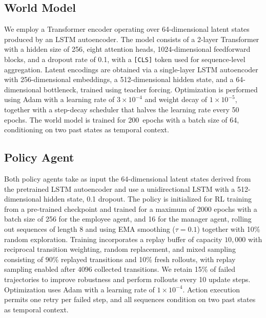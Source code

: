 \subsection{World Model}
We employ a Transformer encoder operating over 64-dimensional latent states produced by an LSTM autoencoder. The model consists of a 2-layer Transformer with a hidden size of 256, eight attention heads, 1024-dimensional feedforward blocks, and a dropout rate of 0.1, with a \texttt{[CLS]} token used for sequence-level aggregation. Latent encodings are obtained via a single-layer LSTM autoencoder with 256-dimensional embeddings, a 512-dimensional hidden state, and a 64-dimensional bottleneck, trained using teacher forcing. Optimization is performed using Adam \citep{KingmaB2015} with a learning rate of $3\times10^{-4}$ and weight decay of $1\times10^{-5}$, together with a step-decay scheduler that halves the learning rate every 50 epochs. The world model is trained for 200~epochs with a batch size of 64, conditioning on two past states as temporal context.

\subsection{Policy Agent}
Both policy agents take as input the 64-dimensional latent states derived from the pretrained LSTM autoencoder and use a unidirectional LSTM with a 512-dimensional hidden state, 0.1 dropout. The policy is initialized for RL training from a pre-trained checkpoint and trained for a maximum of 2000 epochs with a batch size of 256 for the employee agent, and 16 for the manager agent, rolling out sequences of length 8 and using EMA smoothing ($\tau = 0.1$) together with 10\% random exploration. Training incorporates a replay buffer of capacity $10{,}000$ with reciprocal transition weighting, random replacement, and mixed sampling consisting of 90\% replayed transitions and 10\% fresh rollouts, with replay sampling enabled after $4096$ collected transitions. We retain 15\% of failed trajectories to improve robustness and perform rollouts every 10 update steps. Optimization uses Adam \citep{KingmaB2015} with a learning rate of $1\times 10^{-4}$. Action execution permits one retry per failed step, and all sequences condition on two past states as temporal context.









